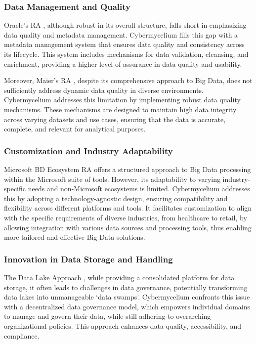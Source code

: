 \documentclass[review]{elsarticle}
\begin{document}
\subsubsection{Data Management and Quality}
Oracle's RA \cite{cackett2013information}, although robust in its overall structure, falls short in emphasizing data quality and metadata management. Cybermycelium fills this gap with a metadata management system that ensures data quality and consistency across its lifecycle. This system includes mechanisms for data validation, cleansing, and enrichment, providing a higher level of assurance in data quality and usability.

Moreover, Maier's RA \cite{Maier}, despite its comprehensive approach to Big Data, does not sufficiently address dynamic data quality in diverse environments. Cybermycelium addresses this limitation by implementing robust data quality mechanisms. These mechanisms are designed to maintain high data integrity across varying datasets and use cases, ensuring that the data is accurate, complete, and relevant for analytical purposes.


\subsubsection{Customization and Industry Adaptability}
Microsoft BD Ecosystem RA \cite{levin2013big} offers a structured approach to Big Data processing within the Microsoft suite of tools. However, its adaptability to varying industry-specific needs and non-Microsoft ecosystems is limited. Cybermycelium addresses this by adopting a technology-agnostic design, ensuring compatibility and flexibility across different platforms and tools. It facilitates customization to align with the specific requirements of diverse industries, from healthcare to retail, by allowing integration with various data sources and processing tools, thus enabling more tailored and effective Big Data solutions.

\subsubsection{Innovation in Data Storage and Handling}
The Data Lake Approach \cite{paakkonen2015reference}, while providing a consolidated platform for data storage, it often leads to challenges in data governance, potentially transforming data lakes into unmanageable `data swamps'. Cybermycelium confronts this issue with a decentralized data governance model, which empowers individual domains to manage and govern their data, while still adhering to overarching organizational policies. This approach enhances data quality, accessibility, and compliance.
\end{document}
